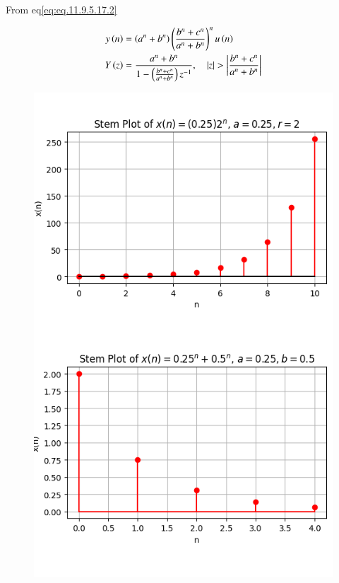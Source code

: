 \documentclass[journal,12pt,twocolumn]{IEEEtran}
\theoremstyle{remark}
\begin{document}
From eq\eqref{eq:eq.11.9.5.17.2}

\begin{align}
    y\left(n\right) &= \left(a^n + b^n\right) \left(\frac{b^n + c^n}{a^n + b^n}\right)^{n} u\left(n\right)\\
    Y\left(z\right) &= \frac{a^n + b^n}{1-\left(\frac{b^n + c^n}{a^n + b^n}\right) z^{-1}}, \quad \left\vert z\right\vert>\left\vert\frac{b^n + c^n}{a^n + b^n}\right\vert
\end{align}


\begin{figure}[ht]
   \centering
   \includegraphics[width=0.9\columnwidth]{figs/gp.png}
\end{figure}
\end{document}
